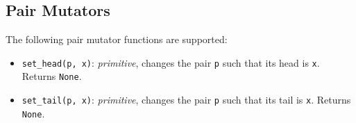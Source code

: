 \subsection*{Pair Mutators}

The following pair mutator functions are supported:

\begin{itemize}
\item \lstinline{set_head(p, x)}: \textit{primitive}, changes the pair \lstinline{p} such that its head is \lstinline{x}.
Returns \lstinline{None}.
\item \lstinline{set_tail(p, x)}: \textit{primitive}, changes the pair \lstinline{p} such that its tail is \lstinline{x}.
Returns \lstinline{None}.
\end{itemize}
